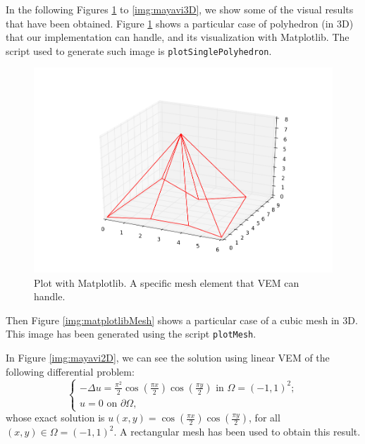In the following Figures \ref{img:geom} to \ref{img:mayavi3D}, we show some of the visual results that have been obtained. Figure \ref{img:geom} shows a particular case of polyhedron (in $3$D) that our implementation can handle, and its visualization with Matplotlib. The script used to generate such image is \verb|plotSinglePolyhedron|. 

\begin{figure}[!h]
\centering
\includegraphics[scale=0.4]{images/matplotlibTest5.png}
\caption{Plot with Matplotlib. A specific mesh element that VEM can handle.}\label{img:geom}
\end{figure}

Then Figure \ref{img:matplotlibMesh} shows a particular case of a cubic mesh in $3$D. This image has been generated using the script \verb|plotMesh|. 

In Figure \ref{img:mayavi2D}, we can see the solution using linear VEM of the following differential problem:
\begin{equation*}
\begin{cases}
-\Delta u = \frac{\pi^2}{2}\cos\left(\frac{\pi x}{2}\right)\cos\left(\frac{\pi y}{2}\right) \text{ in } \Omega=(-1,1)^2;\\
u = 0 \text{ on } \partial \Omega,
\end{cases}
\end{equation*}
whose exact solution is $u(x,y)=\cos\left(\frac{\pi x}{2}\right)\cos\left(\frac{\pi y}{2}\right)$, for all $(x,y)\in \Omega=(-1,1)^2$. A rectangular mesh has been used to obtain this result. 

